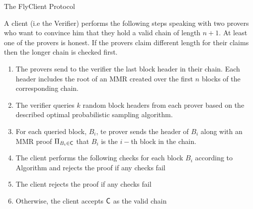 \begin{section}{The FlyClient Protocol}
	\begin{algorithm}[h]
		\caption{\label{alg:flyclient_suffix_protocol}FlyClient protocol~\cite{flyclient}}
		A client (i.e the Verifier) performs the following steps speaking with two provers who want to convince him that they hold a valid chain of length $n+1$. At least one of the provers is honest. If the provers claim different length for their claims then the longer chain is checked first.
		\begin{enumerate}
			\item The provers send to the verifier the last block header in their chain. Each header includes the root of an MMR created over the first $n$ blocks of the corresponding chain. 
			\item The verifier queries $k$ random block headers from each prover based on the described optimal probabilistic sampling algorithm.
			\item For each queried block, $B_i$, te prover sends the header of $B_i$ along with an MMR proof $\Pi_{B_i \in \mathsf{C}}$ that $B_i$ is the $i-$th block in the chain.
			\item The client performs the following checks for each block $B_i$ according to Algorithm  and rejects the proof if any checks fail
			\item The client rejects the proof if any checks fail
			\item Otherwise, the client accepts $\mathsf{C}$ as the valid chain
		\end{enumerate}
	\end{algorithm}


\end{section}
